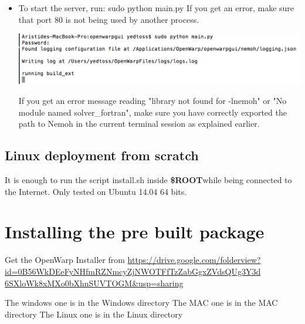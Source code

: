 \documentclass[12pt]{article}
\newcommand{\ROOT}{{\textbf{\$ROOT}}}
\begin{document}
\begin{itemize}
							
							\item
							To start the server, run:
								{\color{blue} sudo python main.py}
							If you get an error, make sure that port 80 is not being used by another process.
							
						\vspace{\abovedisplayskip}
						\begin{minipage}{\linewidth}
							\centering
							\includegraphics[scale=0.75]{img/19}
						\end{minipage}
						\vspace{\belowdisplayskip}
						
						If you get an error message reading "library not found for -lnemoh" or "No module named solver{\_}fortran", make sure you have correctly exported the path to Nemoh in the current terminal session as explained earlier.
						
					
					
					
					
					
					
				
	
	
\end{itemize}


\subsection{Linux deployment from scratch}

It is enough to run the script install.sh inside \ROOT while being connected to the Internet. Only tested on Ubuntu 14.04 64 bits.


\section{Installing the pre built package}
\label{prebuilt}

Get the OpenWarp Installer from
\url{https://drive.google.com/folderview?id=0B56WkDEeFyNHfmRZNmcyZjNWOTFfTzZabGgxZVdsQUg3Y3d 6SXloWk8xMXo0bXhnSUVTOGM&usp=sharing}

The windows one is in the Windows directory The MAC one is in the MAC directory
The Linux one is in the Linux directory
\end{document}
